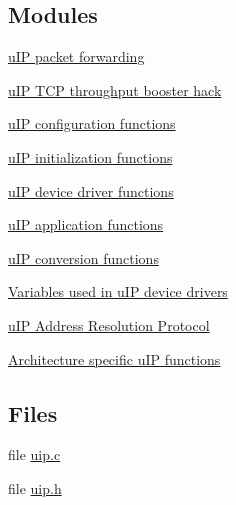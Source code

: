 \subsection*{Modules}
\begin{DoxyCompactItemize}
\item 
\hyperlink{group__uipfw}{uIP packet forwarding}
\item 
\hyperlink{group__uipsplit}{uIP TCP throughput booster hack}
\item 
\hyperlink{group__uipconffunc}{uIP configuration functions}
\item 
\hyperlink{group__uipinit}{uIP initialization functions}
\item 
\hyperlink{group__uipdevfunc}{uIP device driver functions}
\item 
\hyperlink{group__uipappfunc}{uIP application functions}
\item 
\hyperlink{group__uipconvfunc}{uIP conversion functions}
\item 
\hyperlink{group__uipdrivervars}{Variables used in uIP device drivers}
\item 
\hyperlink{group__uiparp}{uIP Address Resolution Protocol}
\item 
\hyperlink{group__uiparch}{Architecture specific uIP functions}
\end{DoxyCompactItemize}
\subsection*{Files}
\begin{DoxyCompactItemize}
\item 
file \hyperlink{uip_8c}{uip.c}
\item 
file \hyperlink{uip_8h}{uip.h}
\end{DoxyCompactItemize}
